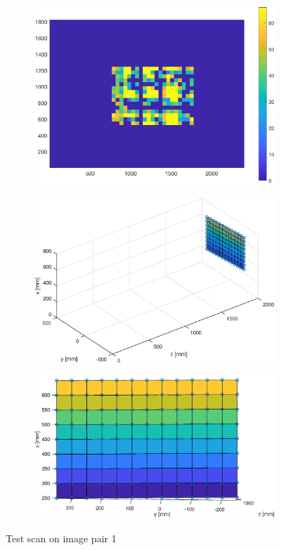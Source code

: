 \begin{figure}[h!]
\begin{subfigure}[t]{0.35\linewidth}
		\includegraphics[width=1\linewidth]{figures/part2/test1_cmp}
	\end{subfigure}
	\begin{subfigure}[t]{0.45\linewidth}
		\centering
		\includegraphics[width=1\linewidth]{figures/part2/test1_scan}
	\end{subfigure}
	\begin{subfigure}[t]{0.45\linewidth}
		\centering
		\includegraphics[width=1\linewidth]{figures/part2/test1_scan1}
	\end{subfigure}
	\caption{Test scan on image pair 1}
\end{figure}
